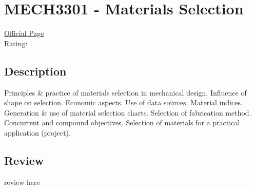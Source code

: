 \hypertarget{MECH3301}{\section{MECH3301 - Materials Selection}}

\large
\textcolor{turbo_purple}{\href{https://my.uq.edu.au/programs-courses/course.html?course_code=MECH3301}{Official Page}} \\
Rating: \cstar\cstar\cstar\cstar\ostar

\normalsize
\subsection*{Description}
Principles \& practice of materials selection in mechanical design.
Influence of shape on selection.
Economic aspects.
Use of data sources.
Material indices.
Generation \& use of material selection charts. Selection of fabrication method.
Concurrent and compound objectives.
Selection of materials for a practical application (project).

\subsection*{Review}
review here
